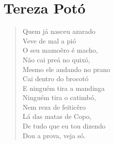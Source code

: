 \chapter{Tereza Potó}

\begin{verse}
Quem já nasceu azarado\\
Veve de mal a pió\\
O seu mamoêro é macho,\\
Não cai preá no quixó,\\
Mesmo ele andando no prano\\
Cai dentro do brocotó\\
E ninguém tira a mandinga\\
Ninguém tira o catimbó,\\
Nem reza de feiticêro\\
Lá das matas de Copo,\\
De tudo que eu tou dizendo\\
Dou a prova, veja só.


\end{verse}
